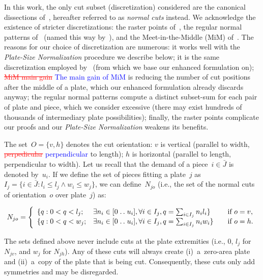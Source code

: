 \documentclass[smallextended]{svjour3}       %
\newif\iffinalversion
\newcommand{\newtext}[1]{\iffinalversion%
#1%
\else%
\textcolor{blue}{#1}%
\fi%
}
\newcommand{\oldtext}[1]{\iffinalversion%
#1%
\else%
\textcolor{red}{\sout{#1}}%
\fi%
}
\newcommand{\isep}{\mathrel{{.}\,{.}}\nobreak} %
\begin{document}
In this work, the only cut subset (discretization) considered are the canonical dissections of~\cite{herz:1972}, hereafter referred to as \emph{normal cuts} instead.
We acknowledge the existence of stricter discretizations: the raster points of~\cite{terno:1987,guntram:1966}, the regular normal patterns of~\cite{boschetti:2002} (named this way by~\cite{cote:2018}), and the Meet-in-the-Middle (MiM) of~\cite{cote:2018}.
The reasons for our choice of discretization are numerous:
it works well with the \emph{Plate-Size Normalization} procedure we describe below;
it is the same discretization employed by~\cite{furini:2016} (from which we base our enhanced formulation on);
\oldtext{MiM main gain}\newtext{The main gain of MiM} is reducing the number of cut positions after the middle of a plate, which our enhanced formulation already discards anyway;
the regular normal patterns compute a distinct subset-sum for each pair of plate and piece, which we consider excessive (there may exist hundreds of thousands of intermediary plate possibilities);
finally, the raster points complicate our proofs and our \emph{Plate-Size Normalization} weakens its benefits.

The set~\(O = \{v, h\}\) denotes the cut orientation: \(v\) is vertical (parallel to width, \oldtext{perpedicular}\newtext{perpendicular} to length); \(h\) is horizontal (parallel to length, perpendicular to width).
Let us recall that the demand of a piece~\(i \in \bar{J}\) is denoted by~\(u_i\).
If we define the set of pieces fitting a plate~\(j\) as~\(I_j = \{i \in \bar{J} : l_i \leq l_j \land w_i \leq w_j \}\), we can define~\(N_{jo}\) (i.e., the set of the normal cuts of orientation~\(o\) over plate~\(j\)) as:

{\iffinalversion\else\color{blue}\fi
\begin{equation}
N_{jo}= \left\{
\begin{array}{lllr}
  \{q: 0 < q < l_j; & \exists n_i \in [0 \isep u_i], \forall i \in I_j, q = \sum_{i\in I_j} n_i l_i \} & \quad \text{if } o = v,\\
  \{q: 0 < q < w_j; & \exists n_i \in [0 \isep u_i], \forall i \in I_j, q = \sum_{i\in I_j} n_i w_i \} & \quad \text{if } o = h.
\end{array}\right.
\end{equation}
}

The sets defined above never include cuts at the plate extremities (i.e., \(0\), \(l_j\) for \(N_{jv}\), and \(w_j\) for \(N_{jh}\)).
Any of these cuts will always create (i)~a~zero-area plate and (ii)~a~copy of the plate that is being cut.
Consequently, these cuts only add symmetries and may be disregarded.
\end{document}
